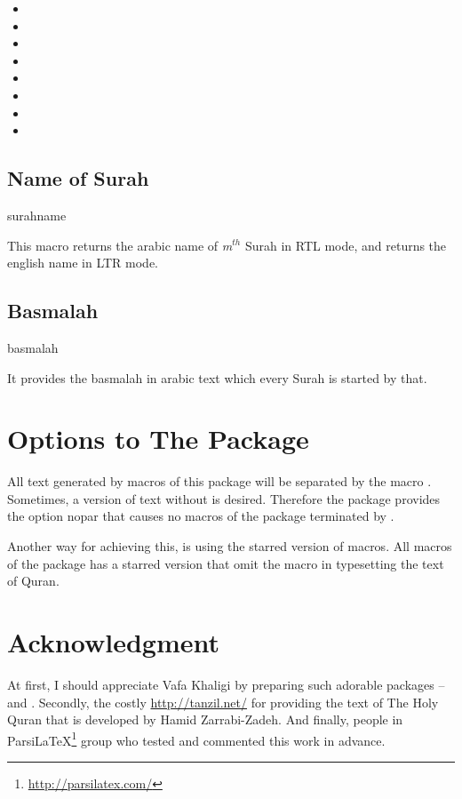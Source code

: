 \documentclass{ltxdoc}
\begin{document}
\begin{itemize}
    \item {}
    \item {}
    \item {}
    \item {}
    \item {}
    \item {}
    \item {}
    \item {}
\end{itemize}

\subsection{Name of Surah}
\begin{declcs}{surahname}
\end{declcs}
This macro returns the arabic name of \textit{m}$^{th}$ Surah in RTL mode, and returns the 
english name in LTR mode.

\subsection{Basmalah}
\begin{declcs}{basmalah}
\end{declcs}
It provides the basmalah in arabic text which every Surah is started by that.

\section{Options to The Package}
All text generated by macros of this package will be separated by the macro . Sometimes, 
a version of text without  is desired. Therefore the package provides the option nopar
that causes no macros of the package terminated by .

Another way for achieving this, is using the starred version of macros. All macros of the package
has a starred version that omit the  macro in typesetting the text of Quran. 

\section{Acknowledgment}
At first, I should appreciate Vafa Khaligi by preparing such adorable packages -- and 
. Secondly, the costly \url{http://tanzil.net/} for providing the text of The Holy Quran that 
is developed by Hamid Zarrabi-Zadeh. And finally, people in Parsi\LaTeX\footnote{\url{http://parsilatex.com/}}
group who tested and commented this work in advance. 
\end{document}
